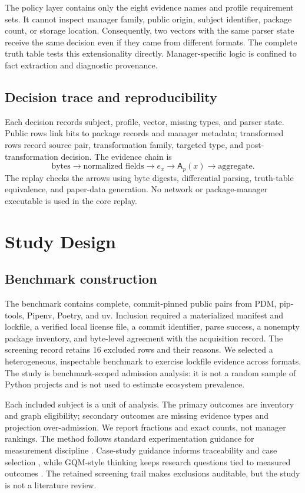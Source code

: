 \documentclass[10pt,conference]{IEEEtran}
\newcommand{\admit}{\mathsf{A}}
\begin{document}
The policy layer contains only the eight evidence names and profile requirement sets. It cannot inspect manager family, public origin, subject identifier, package count, or storage location. Consequently, two vectors with the same parser state receive the same decision even if they came from different formats. The complete truth table tests this extensionality directly. Manager-specific logic is confined to fact extraction and diagnostic provenance.

\subsection{Decision trace and reproducibility}
Each decision records subject, profile, vector, missing types, and parser state. Public rows link bits to package records and manager metadata; transformed rows record source pair, transformation family, targeted type, and post-transformation decision. The evidence chain is
\begin{equation}
\text{bytes}\rightarrow\text{normalized fields}\rightarrow e_x\rightarrow\admit_p(x)\rightarrow\text{aggregate}.
\end{equation}
The replay checks the arrows using byte digests, differential parsing, truth-table equivalence, and paper-data generation. No network or package-manager executable is used in the core replay.

\section{Study Design}
\subsection{Benchmark construction}
The benchmark contains \SubjectCount{} complete, commit-pinned public pairs from PDM, pip-tools, Pipenv, Poetry, and uv. Inclusion required a materialized manifest and lockfile, a verified local license file, a commit identifier, parse success, a nonempty package inventory, and byte-level agreement with the acquisition record. The screening record retains 16 excluded rows and their reasons. We selected a heterogeneous, inspectable benchmark to exercise lockfile evidence across formats. The study is benchmark-scoped admission analysis: it is not a random sample of Python projects and is not used to estimate ecosystem prevalence.

Each included subject is a unit of analysis. The primary outcomes are inventory and graph eligibility; secondary outcomes are missing evidence types and projection over-admission. We report fractions and exact counts, not manager rankings. The method follows standard experimentation guidance for measurement discipline \cite{wohlin2012experimentation}. Case-study guidance informs traceability \cite{runeson2009case} and case selection \cite{shull2008guide}, while GQM-style thinking keeps research questions tied to measured outcomes \cite{basili1994gqm}. The retained screening trail makes exclusions auditable, but the study is not a literature review.
\end{document}
